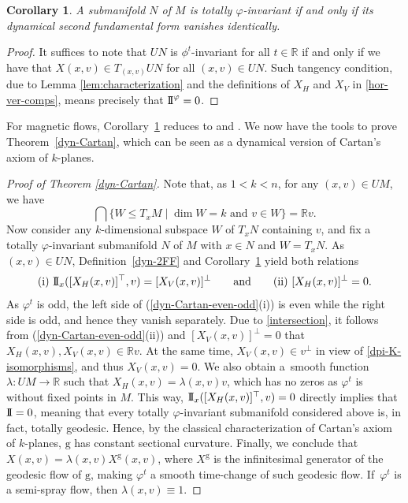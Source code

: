 \documentclass[10pt,a4paper]{amsart}
\newcommand{\g}{\mathrm{g}}
\newcommand{\R}{\mathbb{R}}
\numberwithin{equation}{section}
\newtheorem{Corollary}[Theorem]{Corollary}
\theoremstyle{definition}
\begin{document}
\begin{Corollary} \label{thm:characterization-dynamical-second-fund-form}
 A submanifold $N$ of $M$ is totally $\varphi$-invariant if and only if its dynamical second fundamental form vanishes identically.
\end{Corollary}

\begin{proof}
 It suffices to note that $UN$ is $\phi^t$-invariant for all $t\in \R$ if and only if we have that $X(x,v) \in T_{(x,v)}UN$ for all $(x,v)\in UN$. Such tangency condition, due to Lemma \ref{lem:characterization} and the definitions of $X_H$ and $X_V$ in \eqref{hor-ver-comps}, means precisely that ${\rm I\!I}^\varphi = 0$.
\end{proof}

For magnetic flows, Corollary~\ref{thm:characterization-dynamical-second-fund-form} reduces to \cite[Theorem~1.4]{ABM_2025} and \cite[Remark~4.2\,(i)]{terek2025submanifold}.
We now have the tools to prove Theorem~\ref{dyn-Cartan}, which can be seen as a dynamical version of Cartan's axiom of $k$-planes.

\begin{proof}[Proof of Theorem \ref{dyn-Cartan}]
 Note that, as $1< k<n$, for any $(x,v)\in UM$, we have
 \begin{equation}\label{intersection}
 \bigcap \{ W \leqslant T_xM \mid \dim W=k\mbox{ and }v\in W\} = \R v.
 \end{equation}Now consider any $k$-dimensional subspace $W$ of $T_xN$ containing $v$, and fix a totally \mbox{$\varphi$-in\-va\-ri\-ant} submanifold $N$ of $M$ with $x\in N$ and $W=T_xN$. As $(x,v) \in UN$, Definition~\ref{dyn-2FF} and Corollary~\ref{thm:characterization-dynamical-second-fund-form} yield both relations \begin{equation}\label{dyn-Cartan-even-odd}
 {\rm (i)}~ {\rm I\!I}_x( [X_H(x,v)]^\top, v) = [X_V(x,v)]^\perp \qquad\mbox{and}\qquad {\rm (ii)}~[X_H(x,v)]^\perp = 0 .
 \end{equation}As $\varphi^t$ is odd, the left side of (\ref{dyn-Cartan-even-odd}(i)) is even while the right side is odd, and hence they vanish separately. Due to \eqref{intersection}, it follows from \mbox{(\ref{dyn-Cartan-even-odd}(ii))} and $[X_V(x,v)]^\perp = 0$ that \mbox{$X_H(x,v),X_V(x,v) \in \R v$}. At the same time, \mbox{$X_V(x,v) \in v^\perp$} in view of \eqref{dpi-K-isomorphisms}, and thus $X_V(x,v)=0$. We also obtain a~smooth function $\lambda\colon UM\to \R$ such that $X_H(x,v)= \lambda(x,v)v$, which has no zeros as $\varphi^t$ is without fixed points in $M$. This way, ${\rm I\!I}_x( [X_H(x,v)]^\top, v) = 0$ directly implies that ${\rm I\!I}=0$, meaning that every totally $\varphi$-invariant submanifold considered above is, in fact, totally geodesic. Hence, by the classical characterization of Cartan's axiom of $k$-planes, $\g$ has constant sectional curvature. Finally, we conclude that $X(x,v) = \lambda(x,v) X^\g(x,v)$, where $X^\g$ is the infinitesimal generator of the geodesic flow of $\g$, making $\varphi^t$ a smooth time-change of such geodesic flow. If~$\varphi^t$ is a semi-spray flow, then $\lambda(x,v) \equiv 1$.
\end{proof}
\end{document}
